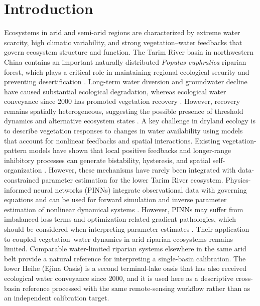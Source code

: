 \documentclass[preprint,review,12pt,3p]{elsarticle}
\begin{document}
	\section{Introduction}
	
	Ecosystems in arid and semi-arid regions are characterized by extreme water scarcity, high climatic variability, and strong vegetation--water feedbacks that govern ecosystem structure and function. The Tarim River basin in northwestern China contains an important naturally distributed \textit{Populus euphratica} riparian forest, which plays a critical role in maintaining regional ecological security and preventing desertification \citep{zhou2020ecolind}. Long-term water diversion and groundwater decline have caused substantial ecological degradation, whereas ecological water conveyance since 2000 has promoted vegetation recovery \citep{chen2010hyp,ma2025response,ye2010ecological}. However, recovery remains spatially heterogeneous, suggesting the possible presence of threshold dynamics and alternative ecosystem states \citep{scheffer2001catastrophic}.
	A key challenge in dryland ecology is to describe vegetation responses to changes in water availability using models that account for nonlinear feedbacks and spatial interactions. Existing vegetation-pattern models have shown that local positive feedbacks and longer-range inhibitory processes can generate bistability, hysteresis, and spatial self-organization \citep{borgogno2009mathematical,rietkerk2008regular,vonhardenberg2001diversity,meron2012pattern}. However, these mechanisms have rarely been integrated with data-constrained parameter estimation for the lower Tarim River ecosystem.
	Physics-informed neural networks (PINNs) integrate observational data with governing equations and can be used for forward simulation and inverse parameter estimation of nonlinear dynamical systems \citep{raissi2019physics,karniadakis2021physics,lu2021deepxde}. However, PINNs may suffer from imbalanced loss terms and optimization-related gradient pathologies, which should be considered when interpreting parameter estimates \citep{wang2021gradient}. Their application to coupled vegetation--water dynamics in arid riparian ecosystems remains limited.
Comparable water-limited riparian systems elsewhere in the same arid belt provide a natural reference for interpreting a single-basin calibration. The lower Heihe (Ejina Oasis) is a second terminal-lake oasis that has also received ecological water conveyance since 2000, and it is used here as a descriptive cross-basin reference processed with the same remote-sensing workflow rather than as an independent calibration target.
	
\end{document}
